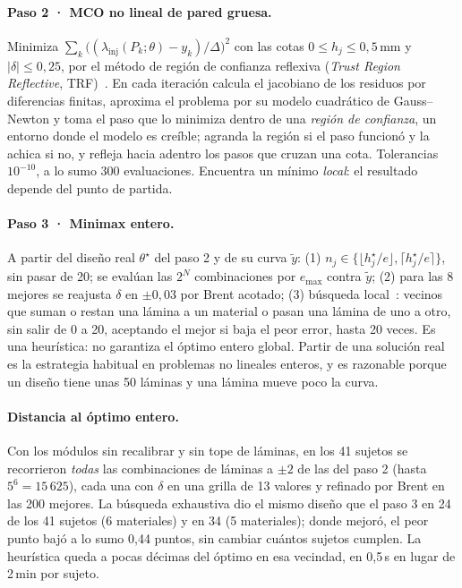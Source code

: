 \paragraph{Paso 2 · MCO no lineal de pared gruesa.} Minimiza $\sum_k\bigl((\lambda_{\mathrm{inj}}(P_k;\theta)-y_k)/\Delta\bigr)^2$ con las cotas $0\le h_j\le0{,}5$\,mm y $|\delta|\le0{,}25$, por el método de región de confianza reflexiva (\emph{Trust Region Reflective}, TRF)~\cite{branch}. En cada iteración calcula el jacobiano de los residuos por diferencias finitas, aproxima el problema por su modelo cuadrático de Gauss--Newton y toma el paso que lo minimiza dentro de una \emph{región de confianza}, un entorno donde el modelo es creíble; agranda la región si el paso funcionó y la achica si no, y refleja hacia adentro los pasos que cruzan una cota. Tolerancias $10^{-10}$, a lo sumo 300 evaluaciones. Encuentra un mínimo \emph{local}: el resultado depende del punto de partida.

\paragraph{Paso 3 · Minimax entero.} A partir del diseño real $\theta^\star$ del paso 2 y de su curva $\tilde y$: (1) $n_j\in\{\lfloor h_j^\star/e\rfloor,\lceil h_j^\star/e\rceil\}$, sin pasar de 20; se evalúan las $2^N$ combinaciones por $e_{\max}$ contra $\tilde y$; (2) para las 8 mejores se reajusta $\delta$ en $\pm0{,}03$ por Brent acotado; (3) búsqueda local~\cite{aarts}: vecinos que suman o restan una lámina a un material o pasan una lámina de uno a otro, sin salir de 0 a 20, aceptando el mejor si baja el peor error, hasta 20 veces. Es una heurística: no garantiza el óptimo entero global. Partir de una solución real es la estrategia habitual en problemas no lineales enteros, y es razonable porque un diseño tiene unas 50 láminas y una lámina mueve poco la curva.

\paragraph{Distancia al óptimo entero.} Con los módulos sin recalibrar y sin tope de láminas, en los 41 sujetos se recorrieron \emph{todas} las combinaciones de láminas a $\pm2$ de las del paso 2 (hasta $5^6=15\,625$), cada una con $\delta$ en una grilla de 13 valores y refinado por Brent en las 200 mejores. La búsqueda exhaustiva dio el mismo diseño que el paso 3 en 24 de los 41 sujetos (6 materiales) y en 34 (5 materiales); donde mejoró, el peor punto bajó a lo sumo 0,44 puntos, sin cambiar cuántos sujetos cumplen. La heurística queda a pocas décimas del óptimo en esa vecindad, en 0,5\,s en lugar de 2\,min por sujeto.

